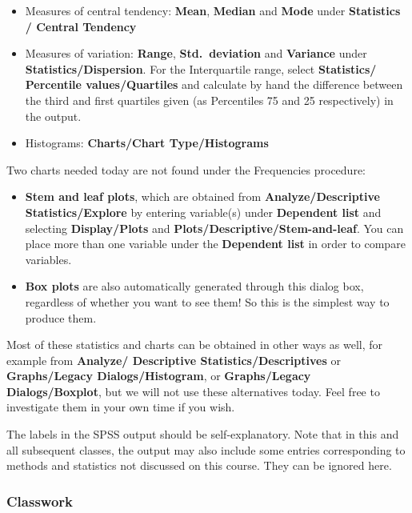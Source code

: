 \documentclass[11pt,a4paper,openany]{book}
\begin{document}
\begin{itemize}
\item
  Measures of central tendency: \textbf{Mean}, \textbf{Median} and
  \textbf{Mode} under \textbf{Statistics / Central Tendency}
\item
  Measures of variation: \textbf{Range}, \textbf{Std.~deviation} and
  \textbf{Variance} under \textbf{Statistics/Dispersion}. For the
  Interquartile range, select \textbf{Statistics/ Percentile
  values/Quartiles} and calculate by hand the difference between the
  third and first quartiles given (as Percentiles 75 and 25
  respectively) in the output.
\item
  Histograms: \textbf{Charts/Chart Type/Histograms}
\end{itemize}

Two charts needed today are not found under the Frequencies procedure:

\begin{itemize}
\item
  \textbf{Stem and leaf plots}, which are obtained from
  \textbf{Analyze/Descriptive Statistics/Explore} by entering
  variable(s) under \textbf{Dependent list} and selecting
  \textbf{Display/Plots} and \textbf{Plots/Descriptive/Stem-and-leaf}.
  You can place more than one variable under the \textbf{Dependent list}
  in order to compare variables.
\item
  \textbf{Box plots} are also automatically generated through this
  dialog box, regardless of whether you want to see them! So this is the
  simplest way to produce them.
\end{itemize}

Most of these statistics and charts can be obtained in other ways as
well, for example from \textbf{Analyze/ Descriptive
Statistics/Descriptives} or \textbf{Graphs/Legacy Dialogs/Histogram}, or
\textbf{Graphs/Legacy Dialogs/Boxplot}, but we will not use these
alternatives today. Feel free to investigate them in your own time if
you wish.

The labels in the SPSS output should be self-explanatory. Note that in
this and all subsequent classes, the output may also include some
entries corresponding to methods and statistics not discussed on this
course. They can be ignored here.

\subsubsection*{Classwork}\label{classwork-1}
\end{document}
